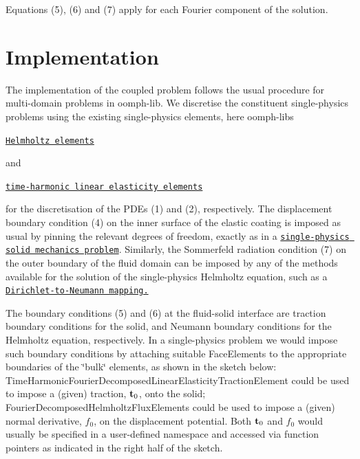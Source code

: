 Equations (5), (6) and (7) apply for each Fourier component of the solution.



 

\hypertarget{index_impl}{}\section{Implementation}\label{index_impl}
The implementation of the coupled problem follows the usual procedure for multi-\/domain problems in {\ttfamily oomph-\/lib}. We discretise the constituent single-\/physics problems using the existing single-\/physics elements, here {\ttfamily oomph-\/lib\textquotesingle{}s} 
\begin{DoxyItemize}
\item \href{../../../fourier_decomposed_helmholtz/sphere_scattering/html/index.html}{\tt Helmholtz elements}
\end{DoxyItemize}and
\begin{DoxyItemize}
\item \href{../../../time_harmonic_fourier_decomposed_linear_elasticity/cylinder/html/index.html}{\tt time-\/harmonic linear elasticity elements}
\end{DoxyItemize}for the discretisation of the P\+D\+Es (1) and (2), respectively. The displacement boundary condition (4) on the inner surface of the elastic coating is imposed as usual by pinning the relevant degrees of freedom, exactly as in a \href{../../../time_harmonic_fourier_decomposed_linear_elasticity/cylinder/html/index.html}{\tt single-\/physics solid mechanics problem}. Similarly, the Sommerfeld radiation condition (7) on the outer boundary of the fluid domain can be imposed by any of the methods available for the solution of the single-\/physics Helmholtz equation, such as a \href{../../../fourier_decomposed_helmholtz/sphere_scattering/html/index.html#DtN}{\tt Dirichlet-\/to-\/\+Neumann mapping.}

The boundary conditions (5) and (6) at the fluid-\/solid interface are traction boundary conditions for the solid, and Neumann boundary conditions for the Helmholtz equation, respectively. In a single-\/physics problem we would impose such boundary conditions by attaching suitable {\ttfamily Face\+Elements} to the appropriate boundaries of the \char`\"{}bulk\char`\"{} elements, as shown in the sketch below\+: {\ttfamily Time\+Harmonic\+Fourier\+Decomposed\+Linear\+Elasticity\+Traction\+Element} could be used to impose a (given) traction, $ {\bf t}_0$, onto the solid; {\ttfamily Fourier\+Decomposed\+Helmholtz\+Flux\+Elements} could be used to impose a (given) normal derivative, $ f_0$, on the displacement potential. Both $ {\bf t}_0$ and $ f_0 $ would usually be specified in a user-\/defined namespace and accessed via function pointers as indicated in the right half of the sketch.

